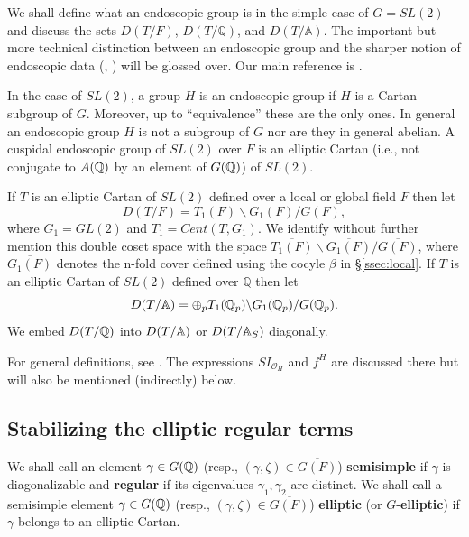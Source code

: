 We shall define what an endoscopic group is in the simple case
of $G=SL(2)$ and discuss the sets $D(T/F)$, $D(T/{\mathbb Q})$,
and $D(T/{\mathbb A})$. The important but more technical distinction
between an endoscopic group and the sharper notion of
endoscopic data (\cite{L3}, \cite{She}) will be glossed over.
Our main reference is \cite{LL}.

In the case of $SL(2)$, a group $H$ is an endoscopic group
if $H$ is a Cartan subgroup of $G$. Moreover, up to ``equivalence''
these are the only ones. In general an endoscopic group $H$
is not a subgroup of $G$ nor are they in general abelian. A
cuspidal endoscopic group of $SL(2)$ over $F$
is an elliptic Cartan (i.e., not conjugate to $A(\mathbb{Q} )$ by an
element of $G(\mathbb{Q} )$) of $SL(2)$. 

If $T$ is an elliptic Cartan of $SL(2)$ defined over
a local or global field $F$ then let
\begin{equation}\label{eq:7.3}
D(T/F)=T_1(F)\backslash G_1(F)/G(F),
\end{equation}
where $G_1=GL(2)$ and $T_1=Cent(T,G_1)$.
We identify without further mention this double coset space with the
space
$\overline{T_1(F)}\backslash \overline{G_1(F)}/ \overline{G(F)}$,
where $\overline{G_1(F)}$ denotes the n-fold cover defined using the
cocyle $\beta$ in \S\ref{ssec:local}.
If $T$ is an elliptic Cartan of $SL(2)$ defined over
${\mathbb Q}$ then let
\begin{equation}\label{eq:7.4}
D(T/\mathbb{A} )
=\oplus_p T_1(\mathbb{Q} _p)\backslash G_1(\mathbb{Q} _p)/G(\mathbb{Q} _p).
\end{equation}
We embed $D(T/\mathbb{Q} )$ into $D(T/\mathbb{A} )$
or $D(T/\mathbb{A} _S)$ diagonally.

For general definitions, see \cite{L3}.
The expressions $SI_{{\mathcal{O}}_H}$ and $f^H$ are discussed there but
will also be mentioned (indirectly) below.

\subsection{Stabilizing the elliptic regular terms}

We shall call an element
$\gamma\in G(\mathbb{Q} )$ (resp.,
$(\gamma,\zeta) \in \overline{G(F)}$) \textbf{semisimple} if $\gamma $ is
diagonalizable and {\bf regular} if its eigenvalues
$\gamma_1,\gamma_2$ are distinct.
We shall call a semisimple element
$\gamma \in G(\mathbb{Q} )$
(resp., $(\gamma,\zeta) \in \overline{G(F)}$) \textbf{elliptic}
(or $G$-\textbf{elliptic}) if $\gamma $ belongs to
an elliptic Cartan.

